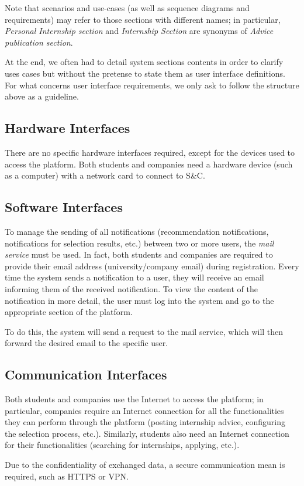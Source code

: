 			Note that scenarios and use-cases (as well as sequence diagrams and requirements) may refer to those sections with different names; in particular, \emph{Personal Internship section} and \emph{Internship Section} are synonyms of \emph{Advice publication section}.
			
			At the end, we often had to detail system sections contents in order to clarify uses cases but without the pretense to state them as user interface definitions. For what concerns user interface requirements, we only ask to follow the structure above as a guideline.
		\subsection{Hardware Interfaces}
			There are no specific hardware interfaces required, except for the devices used to access the platform. Both students and companies need a hardware device (such as a computer) with a network card to connect to S\&C.
		\subsection{Software Interfaces}
				To manage the sending of all notifications (recommendation notifications, notifications for selection results, etc.) between two or more users, the \textit{mail service} must be used. In fact, both students and companies are required to provide their email address (university/company email) during registration. Every time the system sends a notification to a user, they will receive an email informing them of the received notification. To view the content of the notification in more detail, the user must log into the system and go to the appropriate section of the platform.
				
				To do this, the system will send a request to the mail service, which will then forward the desired email to the specific user.
		\subsection{Communication Interfaces}
			Both students and companies use the Internet to access the platform; in particular, companies require an Internet connection for all the functionalities they can perform through the platform (posting internship advice, configuring the selection process, etc.). Similarly, students also need an Internet connection for their functionalities (searching for internships, applying, etc.).
			
			Due to the confidentiality of exchanged data, a secure communication mean is required, such as HTTPS or VPN.
